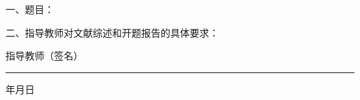 {

    \sihao
    \fangsong
    \bfseries
    
    一、题目：\thtitle
    
    二、指导教师对文献综述和开题报告的具体要求：
    
    \vspace*{\fill}
    
    \xiaosi
    
    \hspace{8.5cm} 指导教师（签名）\rule{6em}{0.4pt}
    
    \hspace{10cm} 年\hspace{2em}月\hspace{2em}日\hspace{3em}
    
    \quad \\
    
    \thispagestyle{empty}
}